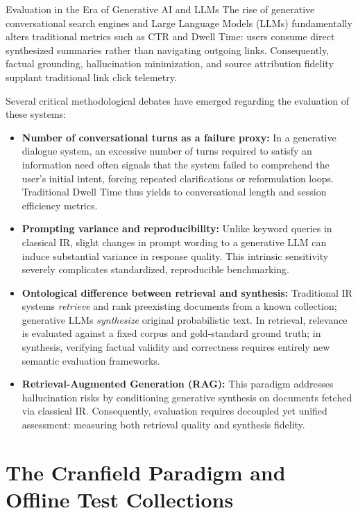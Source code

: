 \begin{alertblock}{Evaluation in the Era of Generative AI and LLMs}
The rise of generative conversational search engines and Large Language Models (LLMs) fundamentally alters traditional metrics such as CTR and Dwell Time: users consume direct synthesized summaries rather than navigating outgoing links. Consequently, factual grounding, hallucination minimization, and source attribution fidelity supplant traditional link click telemetry.

Several critical methodological debates have emerged regarding the evaluation of these systems:
\begin{itemize}
    \item \textbf{Number of conversational turns as a failure proxy:} In a generative dialogue system, an excessive number of turns required to satisfy an information need often signals that the system failed to comprehend the user's initial intent, forcing repeated clarifications or reformulation loops. Traditional Dwell Time thus yields to conversational length and session efficiency metrics.
    \item \textbf{Prompting variance and reproducibility:} Unlike keyword queries in classical IR, slight changes in prompt wording to a generative LLM can induce substantial variance in response quality. This intrinsic sensitivity severely complicates standardized, reproducible benchmarking.
    \item \textbf{Ontological difference between retrieval and synthesis:} Traditional IR systems \emph{retrieve} and rank preexisting documents from a known collection; generative LLMs \emph{synthesize} original probabilistic text. In retrieval, relevance is evaluated against a fixed corpus and gold-standard ground truth; in synthesis, verifying factual validity and correctness requires entirely new semantic evaluation frameworks.
    \item \textbf{Retrieval-Augmented Generation (RAG):} This paradigm addresses hallucination risks by conditioning generative synthesis on documents fetched via classical IR. Consequently, evaluation requires decoupled yet unified assessment: measuring both retrieval quality and synthesis fidelity.
\end{itemize}
\end{alertblock}

\FloatBarrier
\section{The Cranfield Paradigm and Offline Test Collections}

